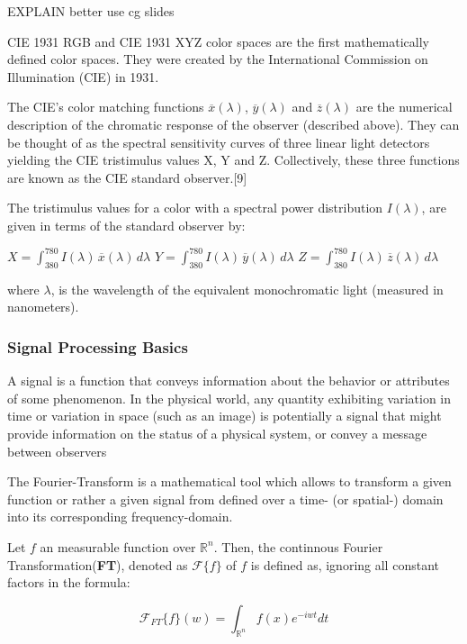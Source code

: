 EXPLAIN better use cg slides


CIE 1931 RGB and CIE 1931 XYZ color spaces are the first mathematically defined color spaces. They were created by the International Commission on Illumination (CIE) in 1931.

The CIE's color matching functions $\overline{x}(\lambda)$, $\overline{y}(\lambda)$ and $\overline{z}(\lambda)$ are the numerical description of the chromatic response of the observer (described above). They can be thought of as the spectral sensitivity curves of three linear light detectors yielding the CIE tristimulus values X, Y and Z. Collectively, these three functions are known as the CIE standard observer.[9]

The tristimulus values for a color with a spectral power distribution $I(\lambda)$, are given in terms of the standard observer by:

    $X= \int_{380}^{780} I(\lambda)\,\overline{x}(\lambda)\,d\lambda$
    $Y= \int_{380}^{780} I(\lambda)\,\overline{y}(\lambda)\,d\lambda$
    $Z= \int_{380}^{780} I(\lambda)\,\overline{z}(\lambda)\,d\lambda$

where $\lambda$, is the wavelength of the equivalent monochromatic light (measured in nanometers).


\subsubsection{Signal Processing Basics}
A signal is a function that conveys information about the behavior or attributes of some phenomenon.
In the physical world, any quantity exhibiting variation in time or variation in space (such as an image) is potentially a signal that might provide information on the status of a physical system, or convey a message between observers

The Fourier-Transform is a mathematical tool which allows to transform a given function or rather a given signal from defined over a time- (or spatial-) domain into its corresponding frequency-domain.
 
Let $f$ an measurable function over $\mathds{R}^n$. Then, the continnous Fourier Transformation(\textbf{FT}), denoted as $\mathcal{F}\{f\}$ of $f$ is defined as, ignoring all constant factors in the formula:
 
\begin{equation}
  \mathcal{F}_{FT}\{f\}(w) = \int_{\mathds{R}^n} f(x)e^{-iwt} dt
\end{equation}

